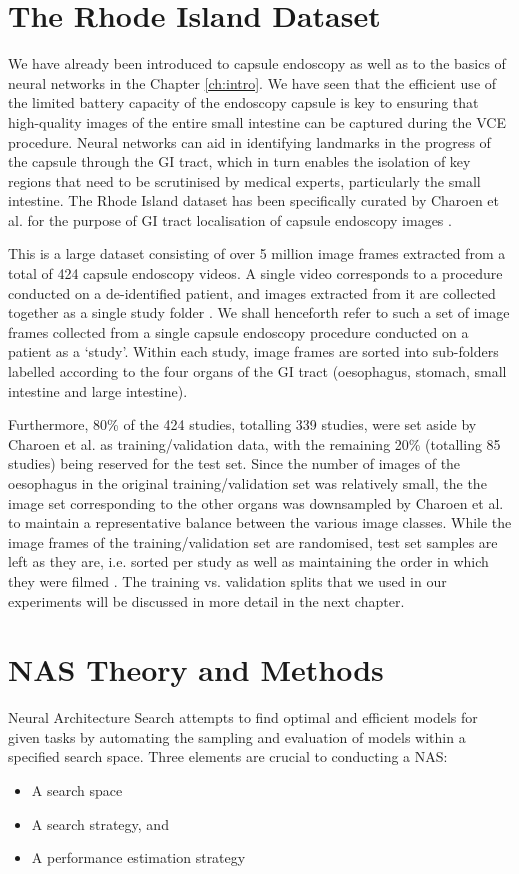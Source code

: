 \documentclass[11pt,a4paper, open=any]{scrbook}
\begin{document}
\section{The Rhode Island Dataset}
We have already been introduced to capsule endoscopy as well as to the basics of neural networks in the Chapter \ref{ch:intro}. We have seen that the efficient use of the limited battery capacity of the endoscopy capsule is key to ensuring that high-quality images of the entire small intestine can be captured during the VCE procedure. Neural networks can aid in identifying landmarks in the progress of the capsule through the GI tract, which in turn enables the isolation of key regions that need to be scrutinised by medical experts, particularly the small intestine. The Rhode Island dataset has been specifically curated by Charoen et al. for the purpose of GI tract localisation of capsule endoscopy images \cite{ri_dataset}.

This is a large dataset consisting of over 5 million image frames extracted from a total of 424 capsule endoscopy videos. A single video corresponds to a procedure conducted on a de-identified patient, and images extracted from it are collected together as a single study folder \cite[2-4]{ri_dataset}. We shall henceforth refer to such a set of image frames collected from a single capsule endoscopy procedure conducted on a patient as a `study'. Within each study, image frames are sorted into sub-folders labelled according to the four organs of the GI tract (oesophagus, stomach, small intestine and large intestine).

Furthermore, 80\% of the 424 studies, totalling 339 studies, were set aside by Charoen et al. as training/validation data, with the remaining 20\% (totalling 85 studies) being reserved for the test set. Since the number of images of the oesophagus in the original training/validation set was relatively small, the the image set corresponding to the other organs was downsampled by Charoen et al. to maintain a representative balance between the various image classes. While the image frames of the training/validation set are randomised, test set samples are left as they are, i.e. sorted per study as well as maintaining the order in which they were filmed \cite[4]{ri_dataset}. The training vs. validation splits that we used in our experiments will be discussed in more detail in the next chapter.

\section{NAS Theory and Methods}
Neural Architecture Search attempts to find optimal and efficient models for given tasks by automating the sampling and evaluation of models within a specified search space. Three elements are crucial to conducting a NAS:
\begin{itemize}
	\item A search space
	\item A search strategy, and
	\item A performance estimation strategy
\end{itemize}
\end{document}
